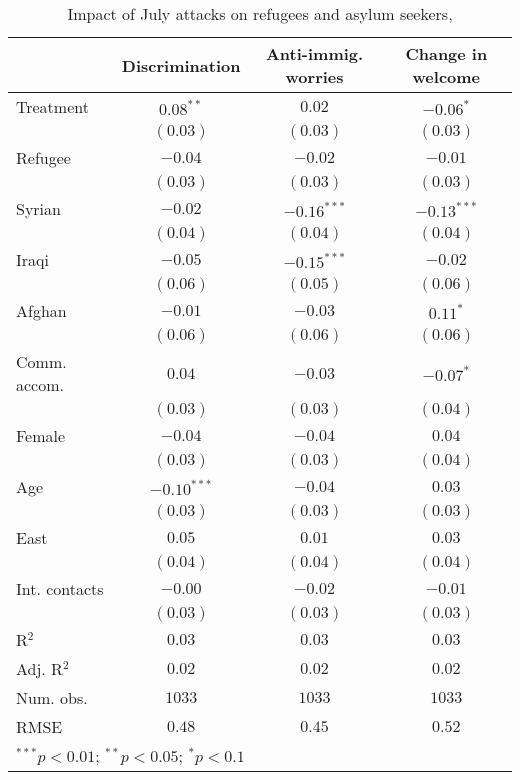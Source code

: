 
\begin{table}
\caption{Impact of July attacks on refugees and asylum seekers, }
\begin{center}
\begin{tabular}{l c c c}
\toprule
 & Discrimination & Anti-immig. worries & Change in welcome \\
\midrule
Treatment     & $0.08^{**}$   & $0.02$        & $-0.06^{*}$   \\
              & $(0.03)$      & $(0.03)$      & $(0.03)$      \\
Refugee       & $-0.04$       & $-0.02$       & $-0.01$       \\
              & $(0.03)$      & $(0.03)$      & $(0.03)$      \\
Syrian        & $-0.02$       & $-0.16^{***}$ & $-0.13^{***}$ \\
              & $(0.04)$      & $(0.04)$      & $(0.04)$      \\
Iraqi         & $-0.05$       & $-0.15^{***}$ & $-0.02$       \\
              & $(0.06)$      & $(0.05)$      & $(0.06)$      \\
Afghan        & $-0.01$       & $-0.03$       & $0.11^{*}$    \\
              & $(0.06)$      & $(0.06)$      & $(0.06)$      \\
Comm. accom.  & $0.04$        & $-0.03$       & $-0.07^{*}$   \\
              & $(0.03)$      & $(0.03)$      & $(0.04)$      \\
Female        & $-0.04$       & $-0.04$       & $0.04$        \\
              & $(0.03)$      & $(0.03)$      & $(0.04)$      \\
Age           & $-0.10^{***}$ & $-0.04$       & $0.03$        \\
              & $(0.03)$      & $(0.03)$      & $(0.03)$      \\
East          & $0.05$        & $0.01$        & $0.03$        \\
              & $(0.04)$      & $(0.04)$      & $(0.04)$      \\
Int. contacts & $-0.00$       & $-0.02$       & $-0.01$       \\
              & $(0.03)$      & $(0.03)$      & $(0.03)$      \\
\midrule
R$^2$         & $0.03$        & $0.03$        & $0.03$        \\
Adj. R$^2$    & $0.02$        & $0.02$        & $0.02$        \\
Num. obs.     & $1033$        & $1033$        & $1033$        \\
RMSE          & $0.48$        & $0.45$        & $0.52$        \\
\bottomrule
\multicolumn{4}{l}{\scriptsize{$^{***}p<0.01$; $^{**}p<0.05$; $^{*}p<0.1$}}
\end{tabular}
\label{tab_host}
\end{center}
\end{table}
